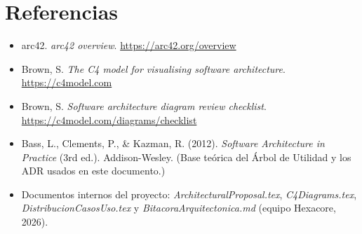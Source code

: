 \documentclass[11pt,a4paper]{article}
\begin{document}
\section{Referencias}
\label{sec:referencias}

\begin{itemize}
\item arc42. \textit{arc42 overview}. \url{https://arc42.org/overview}
\item Brown, S. \textit{The C4 model for visualising software architecture}.
\url{https://c4model.com}
\item Brown, S. \textit{Software architecture diagram review checklist}.
\url{https://c4model.com/diagrams/checklist}
\item Bass, L., Clements, P., \& Kazman, R. (2012). \textit{Software Architecture in Practice}
(3rd ed.). Addison-Wesley. (Base teórica del Árbol de Utilidad y los ADR usados en este
documento.)
\item Documentos internos del proyecto: \textit{ArchitecturalProposal.tex},
\textit{C4Diagrams.tex}, \textit{DistribucionCasosUso.tex} y
\textit{BitacoraArquitectonica.md} (equipo Hexacore, 2026).
\end{itemize}
\end{document}
